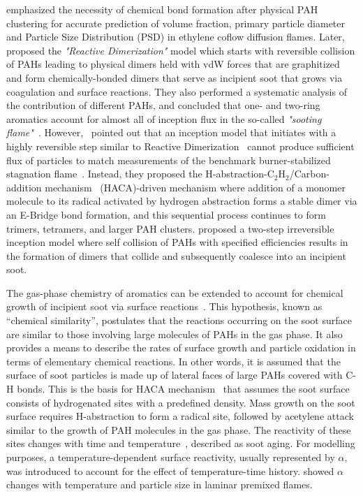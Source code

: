 \citet{kholghy2019role} emphasized the necessity of chemical bond formation after physical PAH clustering for accurate prediction of volume fraction, primary particle diameter and Particle Size Distribution (PSD) in ethylene coflow diffusion flames. Later,~\citet{kholghy2018reactive} proposed the \textit{"Reactive Dimerization"} model which starts with reversible collision of PAHs leading to physical dimers held with vdW forces that are graphitized and form chemically-bonded dimers that serve as incipient soot that grows via  coagulation and surface reactions. They also performed a systematic analysis of the contribution of different PAHs, and concluded that one- and two-ring aromatics account for almost all of inception flux in the so-called \textit{"sooting flame"}~\citep{desgroux2017comparative}. However,~\citet{frenklach2020mechanism} pointed out that an inception model that initiates with a highly reversible step similar to Reactive Dimerization~\citep{kholghy2018reactive} cannot produce sufficient flux of particles to match measurements of the benchmark burner-stabilized stagnation flame~\citep{abid2009quantitative}. Instead, they proposed the H-abstraction-$\mathrm{C_2H_2}$/Carbon-addition  mechanism~\citep{frenklach1991detailed, appel2000kinetic} (HACA)-driven mechanism where addition of a monomer molecule to its radical activated by hydrogen abstraction forms a stable dimer via an E-Bridge bond formation, and this sequential process continues to form trimers, tetramers, and larger PAH clusters. \citet{blanquart2009joint} proposed a two-step irreversible inception model where self collision of PAHs with specified efficiencies results in the formation of dimers that collide and subsequently coalesce into an incipient soot.

The gas-phase chemistry of aromatics can be extended to account for chemical growth of incipient soot via surface reactions~\citep{frenklach2002reaction}. This hypothesis, known as “chemical similarity”, postulates that the reactions occurring on the soot surface are similar to those involving large molecules of PAHs in the gas phase. It also provides a means to describe the rates of surface growth and particle oxidation in
terms of elementary chemical reactions. In other words, it is assumed that the surface of soot particles is made up of lateral faces of large PAHs covered with C-H bonds.
This is the basis for HACA mechanism~\citep{frenklach1991detailed, appel2000kinetic}  that assumes the soot surface consists of hydrogenated sites with a predefined density. Mass growth on the soot surface requires H-abstraction to form a radical
site, followed by acetylene attack similar to the growth of PAH molecules in the gas phase. The reactivity of these sites changes with time and temperature~\citep{woods1991soot, dasch1985decay}, described as soot aging. For modelling purposes, a temperature-dependent surface reactivity, usually represented by $\alpha$, was introduced to account for the effect of temperature-time history. \citet{appel2000kinetic} showed $\alpha$ changes with temperature and particle size in laminar premixed flames.

